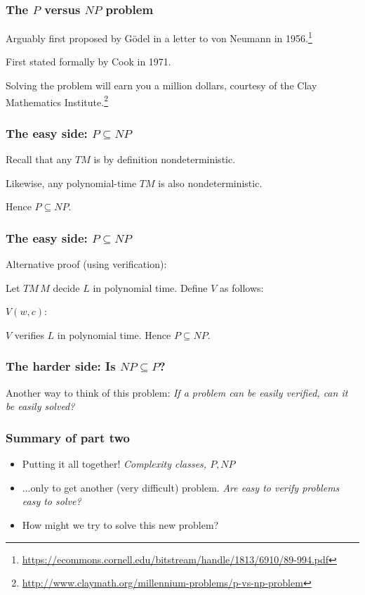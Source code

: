 \documentclass[aspectratio=169]{beamer}
\begin{document}
\begin{frame}
\frametitle{The $P$ versus $NP$ problem}
Arguably first proposed by G\"{o}del in a letter to von Neumann in 1956.\footnote{\url{https://ecommons.cornell.edu/bitstream/handle/1813/6910/89-994.pdf}}

First stated formally by Cook in 1971.

Solving the problem will earn you a million dollars, courtesy of the Clay Mathematics Institute.\footnote{\url{http://www.claymath.org/millennium-problems/p-vs-np-problem}}
\end{frame}

\begin{frame}
\frametitle{The easy side: $P \subseteq NP$}

Recall that any $TM$ is by definition nondeterministic.

Likewise, any polynomial-time $TM$ is also nondeterministic.

Hence $P \subseteq NP$.
\end{frame}

\begin{frame}
\frametitle{The easy side: $P \subseteq NP$}

Alternative proof (using verification):

Let $TM\, M$ decide $L$ in polynomial time. Define $V$ as follows:

\begin{algorithm}[H]
$V(w, c):$\\
\end{algorithm}

$V$ verifies $L$ in polynomial time. Hence $P \subseteq NP$.
\end{frame}

\begin{frame}
\frametitle{The harder side: Is $NP \subseteq P$?}

Another way to think of this problem: {\em If a problem can be easily verified, can it be easily solved?}
\end{frame}

\begin{frame}
\frametitle{Summary of part two}
\begin{itemize}
    \item Putting it all together! {\em Complexity classes, $P, NP$}
    \item ...only to get another (very difficult) problem. {\em Are easy to verify problems easy to solve?}
    \item How might we try to solve this new problem?
\end{itemize}
\end{frame}
\end{document}
